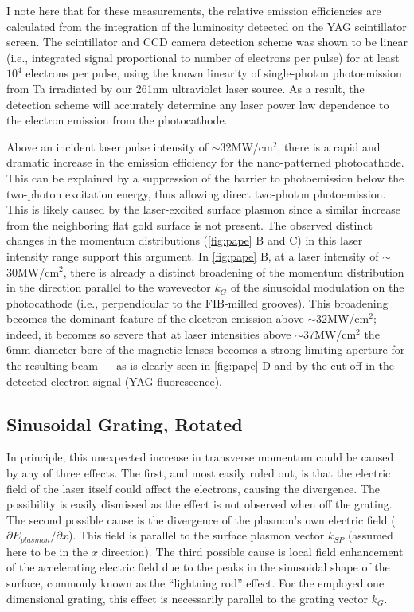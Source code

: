 I note here that for these measurements, the relative emission efficiencies are calculated from the integration of the luminosity detected on the YAG scintillator screen.
The scintillator and CCD camera detection scheme was shown to be linear (i.e., integrated signal proportional to number of electrons per pulse) for at least $10^4$ electrons per pulse, using the known linearity of single-photon photoemission from Ta irradiated by our 261nm ultraviolet laser source.
As a result, the detection scheme will accurately determine any laser power law dependence to the electron emission from the photocathode.

Above an incident laser pulse intensity of $\sim$32MW/cm$^2$, there is a rapid and dramatic increase in the emission efficiency for the nano-patterned photocathode.
This can be explained by a suppression of the barrier to photoemission below the two-photon excitation energy, thus allowing direct two-photon photoemission.
This is likely caused by the laser-excited surface plasmon since a similar increase from the neighboring flat gold surface is not present.
The observed distinct changes in the momentum distributions (\ref{fig:pape} B and C) in this laser intensity range support this argument.
In \ref{fig:pape} B, at a laser intensity of $\sim$30MW/cm$^2$, there is already a distinct broadening of the momentum distribution in the direction parallel to the wavevector $k_G$ of the sinusoidal modulation on the photocathode (i.e., perpendicular to the FIB-milled grooves). 
This broadening becomes the dominant feature of the electron emission above $\sim$32MW/cm$^2$; indeed, it becomes so severe that at laser intensities above $\sim$37MW/cm$^2$ the 6mm-diameter bore of the magnetic lenses becomes a strong limiting aperture for the resulting beam --- as is clearly seen in \ref{fig:pape} D and by the cut-off in the detected electron signal (YAG fluorescence).

\subsection{Sinusoidal Grating, Rotated}

In principle, this unexpected increase in transverse momentum could be caused by any of three effects.
The first, and most easily ruled out, is that the electric field of the laser itself could affect the electrons, causing the divergence.
The possibility is easily dismissed as the effect is not observed when off the grating.
The second possible cause is the divergence of the plasmon's own electric field ($\partial E_{plasmon} / \partial x$).
This field is parallel to the surface plasmon vector $k_{SP}$ (assumed here to be in the $x$ direction).
The third possible cause is local field enhancement of the accelerating electric field due to the peaks in the sinusoidal shape of the surface, commonly known as the ``lightning rod'' effect.
For the employed one dimensional grating, this effect is necessarily parallel to the grating vector $k_G$.

